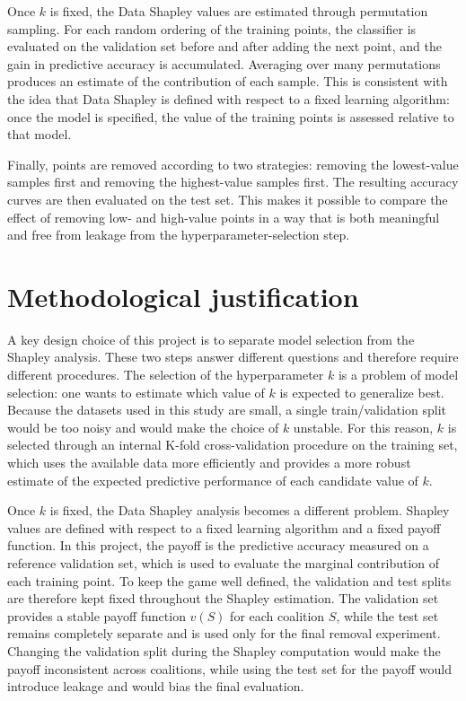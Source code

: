 \documentclass[11pt]{article}
\begin{document}
Once $k$ is fixed, the Data Shapley values are estimated through permutation sampling. For each random ordering of the training points, the classifier is evaluated on the validation set before and after adding the next point, and the gain in predictive accuracy is accumulated. Averaging over many permutations produces an estimate of the contribution of each sample. This is consistent with the idea that Data Shapley is defined with respect to a fixed learning algorithm: once the model is specified, the value of the training points is assessed relative to that model.

Finally, points are removed according to two strategies: removing the lowest-value samples first and removing the highest-value samples first. The resulting accuracy curves are then evaluated on the test set. This makes it possible to compare the effect of removing low- and high-value points in a way that is both meaningful and free from leakage from the hyperparameter-selection step.

\section{Methodological justification}
A key design choice of this project is to separate model selection from the Shapley analysis. These two steps answer different questions and therefore require different procedures. The selection of the hyperparameter $k$ is a problem of model selection: one wants to estimate which value of $k$ is expected to generalize best. Because the datasets used in this study are small, a single train/validation split would be too noisy and would make the choice of $k$ unstable. For this reason, $k$ is selected through an internal K-fold cross-validation procedure on the training set, which uses the available data more efficiently and provides a more robust estimate of the expected predictive performance of each candidate value of $k$.

Once $k$ is fixed, the Data Shapley analysis becomes a different problem. Shapley values are defined with respect to a fixed learning algorithm and a fixed payoff function. In this project, the payoff is the predictive accuracy measured on a reference validation set, which is used to evaluate the marginal contribution of each training point. To keep the game well defined, the validation and test splits are therefore kept fixed throughout the Shapley estimation. The validation set provides a stable payoff function $v(S)$ for each coalition $S$, while the test set remains completely separate and is used only for the final removal experiment. Changing the validation split during the Shapley computation would make the payoff inconsistent across coalitions, while using the test set for the payoff would introduce leakage and would bias the final evaluation.
\end{document}
